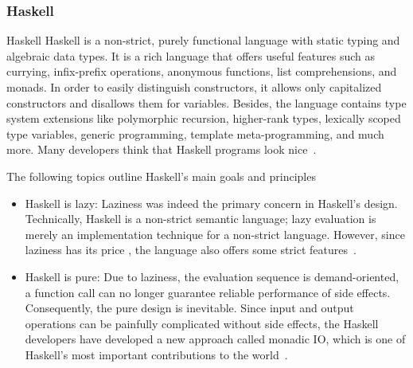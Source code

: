 \begin{frame}\frametitle{Haskell}

    \footnotesize
    \begin{block}{Haskell}
        Haskell is a non-strict, purely functional language with static typing and algebraic data types. It is a rich language that offers useful features such as currying, infix-prefix operations, anonymous functions, list comprehensions, and monads. In order to easily distinguish constructors, it allows only capitalized constructors and disallows them for variables. Besides, the language contains type system extensions like polymorphic recursion, higher-rank types, lexically scoped type variables, generic programming, template meta-programming,  and much more. Many developers think that Haskell programs look nice~\cite{history-of-haskell}.
    \end{block}

    \begin{block}{The following topics outline Haskell's main goals and principles}
    
        \begin{itemize}
            \item Haskell is lazy: 
            Laziness was indeed the primary concern in Haskell's design. Technically, Haskell is a non-strict semantic language; lazy evaluation is merely an implementation technique for a non-strict language.  However, since laziness has its price 
            , the language also offers some strict features~\cite{history-of-haskell}.
    
            \item Haskell is pure: Due to laziness, the evaluation sequence is demand-oriented, a function call can no longer guarantee reliable performance of side effects. Consequently, the pure design is inevitable. Since input and output operations can be painfully complicated without side effects, the Haskell developers have developed a new approach called monadic IO, which is one of Haskell's most important contributions to the world~\cite{history-of-haskell}.
        \end{itemize}

    \end{block}

\end{frame}

